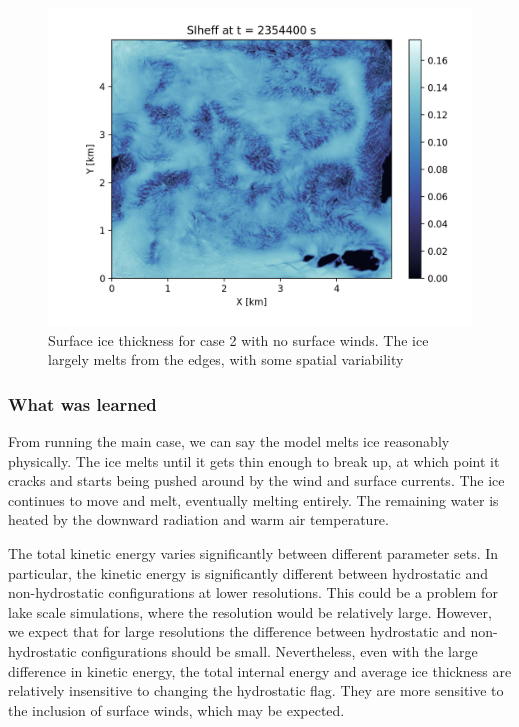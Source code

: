 \documentclass[11pt]{article}
\begin{document}
\begin{figure}[h!]
\centering
\includegraphics[width=0.9\linewidth]{iceMelt/icemeltsmooth-nowind-surface-ice-thick-0001177200}
\caption{Surface ice thickness for case 2 with no surface winds. The ice largely melts from the edges, with some spatial variability}
\label{fig:iceMeltNoWind}
\end{figure}

\subsubsection{What was learned}
From running the main case, we can say the model melts ice reasonably physically. The ice melts until it gets thin enough to break up, at which point it cracks and starts being pushed around by the wind and surface currents. The ice continues to move and melt, eventually melting entirely. The remaining water is heated by the downward radiation and warm air temperature.

The total kinetic energy varies significantly between different parameter sets. In particular, the kinetic energy is significantly different between hydrostatic and non-hydrostatic configurations at lower resolutions. This could be a problem for lake scale simulations, where the resolution would be relatively large. However, we expect that for large resolutions the difference between hydrostatic and non-hydrostatic configurations should be small. Nevertheless, even with the large difference in kinetic energy, the total internal energy and average ice thickness are relatively insensitive to changing the hydrostatic flag. They are more sensitive to the inclusion of surface winds, which may be expected.
\end{document}
